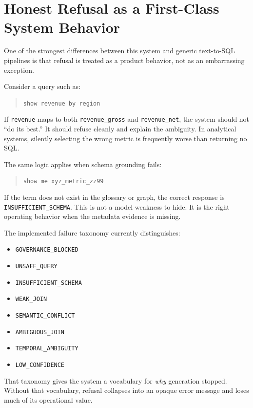 \documentclass[11pt]{article}
\begin{document}
\section{Honest Refusal as a First-Class System Behavior}

One of the strongest differences between this system and generic text-to-SQL pipelines is that refusal is treated as a product behavior, not as an embarrassing exception.

Consider a query such as:

\begin{quote}
\texttt{show revenue by region}
\end{quote}

If \texttt{revenue} maps to both \texttt{revenue\_gross} and \texttt{revenue\_net}, the system should not ``do its best.'' It should refuse cleanly and explain the ambiguity. In analytical systems, silently selecting the wrong metric is frequently worse than returning no SQL.

The same logic applies when schema grounding fails:

\begin{quote}
\texttt{show me xyz\_metric\_zz99}
\end{quote}

If the term does not exist in the glossary or graph, the correct response is \texttt{INSUFFICIENT\_SCHEMA}. This is not a model weakness to hide. It is the right operating behavior when the metadata evidence is missing.

The implemented failure taxonomy currently distinguishes:

\begin{itemize}[leftmargin=1.4em]
  \item \texttt{GOVERNANCE\_BLOCKED}
  \item \texttt{UNSAFE\_QUERY}
  \item \texttt{INSUFFICIENT\_SCHEMA}
  \item \texttt{WEAK\_JOIN}
  \item \texttt{SEMANTIC\_CONFLICT}
  \item \texttt{AMBIGUOUS\_JOIN}
  \item \texttt{TEMPORAL\_AMBIGUITY}
  \item \texttt{LOW\_CONFIDENCE}
\end{itemize}

That taxonomy gives the system a vocabulary for \emph{why} generation stopped. Without that vocabulary, refusal collapses into an opaque error message and loses much of its operational value.
\end{document}
